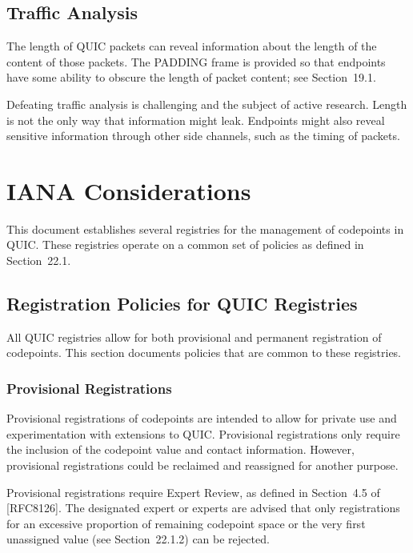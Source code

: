 \documentclass{article}
\begin{document}
\subsection{Traffic Analysis}

The length of QUIC packets can reveal information about the length of the content of those packets.  The PADDING frame is provided so that endpoints have some ability to obscure the length of packet content; see Section~19.1.

Defeating traffic analysis is challenging and the subject of active research.  Length is not the only way that information might leak. Endpoints might also reveal sensitive information through other side channels, such as the timing of packets.

\section{IANA Considerations}

This document establishes several registries for the management of codepoints in QUIC.  These registries operate on a common set of policies as defined in Section~22.1.

\subsection{Registration Policies for QUIC Registries}

All QUIC registries allow for both provisional and permanent registration of codepoints.  This section documents policies that are common to these registries.

\subsubsection{Provisional Registrations}

Provisional registrations of codepoints are intended to allow for private use and experimentation with extensions to QUIC.  Provisional registrations only require the inclusion of the codepoint value and contact information.  However, provisional registrations could be reclaimed and reassigned for another purpose.

Provisional registrations require Expert Review, as defined in Section~4.5 of [RFC8126].  The designated expert or experts are advised that only registrations for an excessive proportion of remaining codepoint space or the very first unassigned value (see Section~22.1.2) can be rejected.
\end{document}
